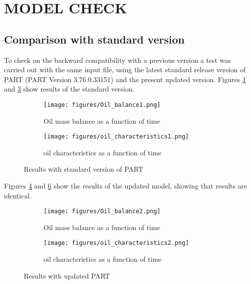 \documentclass[english]{deltares_manual}
\begin{document}
\section{MODEL CHECK} 

\subsection{Comparison with standard version}
To check on the backward compatibility with a previous version a test was carried out with the same input file, using the latest standard release version of PART (PART Version 3.76.0.33151) and the present updated version. Figures \ref{fig:balance1} and \ref{fig:characteristics1} show results of the standard version.\\
\begin{figure}[h!]
	\begin{subfigure}{0.5\textwidth}
	\texttt{[image: figures/Oil\_balance1.png]}
	\caption{Oil mass balance as a function of time}
	\label{fig:balance1}
	\end{subfigure}
	\begin{subfigure}{0.5\textwidth}
	\texttt{[image: figures/oil\_characteristics1.png]}
	\caption{oil characteristics as a function of time}
	\label{fig:characteristics1}
\end{subfigure}
\caption{Results with standard version of PART}
\end{figure}

Figures \ref{fig:balance2} and \ref{fig:characteristics2} show the results of the updated model, showing that results are identical. 

\begin{figure}[h!]
	\begin{subfigure}{0.5\textwidth}
		\texttt{[image: figures/Oil\_balance2.png]}
		\caption{Oil mass balance as a function of time}
		\label{fig:balance2}
	\end{subfigure}
	\begin{subfigure}{0.5\textwidth}
		\texttt{[image: figures/oil\_characteristics2.png]}
		\caption{oil characteristics as a function of time}
		\label{fig:characteristics2}
	\end{subfigure}
	\caption{Results with updated PART}
\end{figure}
\end{document}

